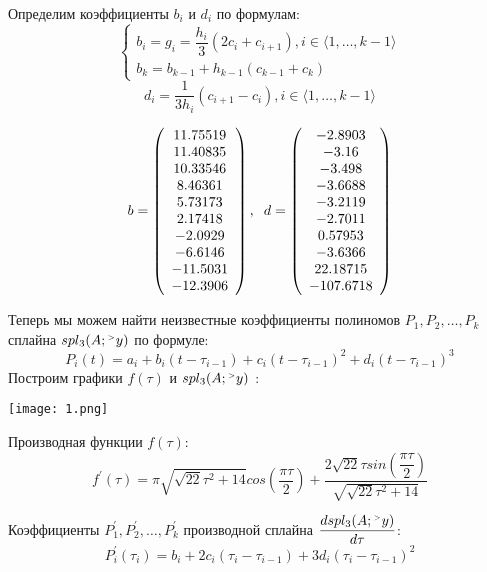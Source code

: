 \documentclass[12pt]{article}
\begin{document}
Определим коэффициенты $b_i$ и $d_i$ по формулам:
$$
\begin{cases}
	b_i = g_i = \dfrac{h_i}{3}(2c_i + c_{i+1}),  i \in \langle 1, \ldots, k - 1 \rangle \\
	b_k = b_{k-1} + h_{k-1}(c_{k-1} + c_k)
\end{cases}
$$
$$
d_i = \dfrac{1}{3h_i}(c_{i+1} - c_i), i \in \langle 1, \ldots, k - 1 \rangle 
$$

$$ 
b =
\left(
\begin{array}{c}
	11.75519 \\ 11.40835 \\ 10.33546 \\ 8.46361 \\ 5.73173 \\ 2.17418 \\ -2.0929 \\ -6.6146 \\ -11.5031 \\ -12.3906
\end{array}
\right) ,
\hspace{0.2cm}
d = 
\left(
\begin{array}{c}
	-2.8903 \\ -3.16 \\ -3.498 \\ -3.6688 \\ -3.2119 \\ -2.7011 \\ 0.57953 \\ -3.6366 \\ 22.18715 \\ -107.6718
\end{array}
\right)
$$ 

Теперь мы можем найти  неизвестные коэффициенты полиномов $P_1, P_2, \ldots, P_k$ сплайна $spl_3(A; {}^{\mathsmaller{>}} y)$ по формуле:
$$
P_i(t) = a_i + b_i(t- \tau_{i-1}) + c_i(t- \tau_{i-1})^2 + d_i(t- \tau_{i-1})^3
$$
Построим графики $f(\tau)$ и $spl_3(A; {}^{\mathsmaller{>}} y)$ :
\begin{center}
	\texttt{[image: 1.png]}
\end{center}

Производная функции $f(\tau)$:
$$f ^ \prime (\tau) = \pi \sqrt{\sqrt{22}\tau^2 + 14}cos(\dfrac{\pi \tau}{2}) + 
\dfrac {2 \sqrt{22} \tau sin(\dfrac{\pi \tau}{2})} {\sqrt{\sqrt{22}\tau^2 + 14}}
$$

Коэффициенты $P_1^\prime, P_2^\prime, \ldots, P_k^\prime$ производной сплайна $\dfrac {d spl_3(A; {}^{\mathsmaller{>}} y)} {d \tau}$:
$$
P_i^\prime(\tau_i) = b_i + 2 c_i(\tau_i - \tau_{i-1}) + 3d_i(\tau_i - \tau_{i-1})^2
$$
\end{document}
